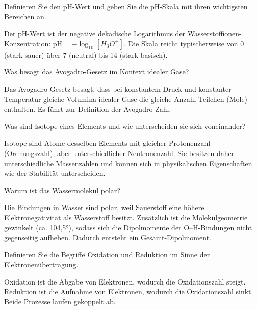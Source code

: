 \begin{exercise}[subtitle=pH-Wert, points=1, Punkt=1]
Definieren Sie den pH-Wert und geben Sie die pH-Skala mit ihren wichtigsten Bereichen an.
\begin{solution}
Der pH-Wert ist der negative dekadische Logarithmus der Wasserstoffionen-Konzentration: \( \mathrm{pH} = -\log_{10}[H_3O^+] \). Die Skala reicht typischerweise von 0 (stark sauer) über 7 (neutral) bis 14 (stark basisch).
\end{solution}
\end{exercise}

\begin{exercise}[subtitle=Avogadro-Gesetz, points=1, Punkt=1]
Was besagt das Avogadro-Gesetz im Kontext idealer Gase?
\begin{solution}
Das Avogadro-Gesetz besagt, dass bei konstantem Druck und konstanter Temperatur gleiche Volumina idealer Gase die gleiche Anzahl Teilchen (Mole) enthalten. Es führt zur Definition der Avogadro-Zahl.
\end{solution}
\end{exercise}

\begin{exercise}[subtitle=Isotope, points=1, Punkt=1]
Was sind Isotope eines Elements und wie unterscheiden sie sich voneinander?
\begin{solution}
Isotope sind Atome desselben Elements mit gleicher Protonenzahl (Ordnungszahl), aber unterschiedlicher Neutronenzahl. Sie besitzen daher unterschiedliche Massenzahlen und können sich in physikalischen Eigenschaften wie der Stabilität unterscheiden.
\end{solution}
\end{exercise}

\begin{exercise}[subtitle=Polarität, points=1, Punkt=1]
Warum ist das Wassermolekül polar?
\begin{solution}
Die Bindungen in Wasser sind polar, weil Sauerstoff eine höhere Elektronegativität als Wasserstoff besitzt. Zusätzlich ist die Molekülgeometrie gewinkelt (ca. 104{,}5°), sodass sich die Dipolmomente der O–H-Bindungen nicht gegenseitig aufheben. Dadurch entsteht ein Gesamt-Dipolmoment.
\end{solution}
\end{exercise}

\begin{exercise}[subtitle=Oxidation und Reduktion, points=1, Punkt=1]
Definieren Sie die Begriffe Oxidation und Reduktion im Sinne der Elektronenübertragung.
\begin{solution}
Oxidation ist die Abgabe von Elektronen, wodurch die Oxidationszahl steigt. Reduktion ist die Aufnahme von Elektronen, wodurch die Oxidationszahl sinkt. Beide Prozesse laufen gekoppelt ab.
\end{solution}
\end{exercise}

